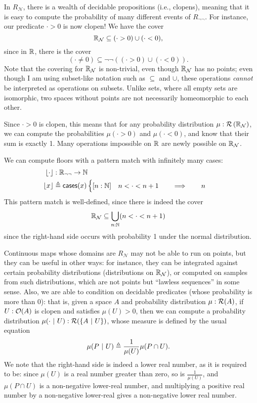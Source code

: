 In $R_\mathcal{N}$, there is a wealth of decidable propositions (i.e., clopens), meaning that it is easy to compute the probability of many different events of $R_{\neg\neg}$. For instance, our predicate $\cdot > 0$ is now clopen! We have the cover
\[
\mathbb{R}_{\mathcal{N}} \subseteq (\cdot > 0) \cup (\cdot < 0),
\]
since in $\mathbb{R}$, there is the cover
\[
(\cdot \neq 0) \subseteq \neg \neg \left( (\cdot > 0) \cup (\cdot < 0) \right).
\]
Note that the covering for $\mathbb{R}_\mathcal{N}$ is non-trivial, even though $\mathbb{R}_\mathcal{N}$ has no points; even though I am using subset-like notation such as $\subseteq$ and $\cup$, these operations \emph{cannot} be interpreted as operations on subsets. Unlike sets, where all empty sets are isomorphic, two spaces without points are not necessarily homeomorphic to each other.

Since $\cdot > 0$ is clopen, this means that for any probability distribution $\mu : \mathcal{R}\left(\mathbb{R}_\mathcal{N}\right)$, we can compute the probabilities $\mu(\cdot > 0)$ and $\mu(\cdot < 0)$, and know that their sum is exactly 1. Many operations impossible on $\mathbb{R}$ are newly possible on $\mathbb{R}_\mathcal{N}$. 

We can compute floors with a pattern match with infinitely many cases:
\begin{align*}
\lfloor \cdot \rfloor &: \mathbb{R}_{\neg\neg} \to \mathbb{N}
\\ \lfloor x \rfloor &\triangleq \mathsf{cases}(x)
\begin{cases}
[n : \mathbb{N}] \quad n < \cdot < n + 1
  \qquad \Longrightarrow \qquad
  n
\end{cases}
\end{align*}
This pattern match is well-defined, since there is indeed the cover
\[
\mathbb{R}_\mathcal{N} \subseteq \bigcup_{n : \mathbb{N}} (n < \cdot < n + 1)
\]
since the right-hand side occurs with probability 1 under the normal distribution.

Continuous maps whose domains are $R_\mathcal{N}$ may not be able to run on points, but they can be useful in other ways: for instance, they can be integrated against certain probability distributions (distributions on $\mathbb{R}_\mathcal{N}$), or computed on samples from such distributions, which are not points but ``lawless sequences'' in some sense. Also, we are able to condition on decidable predicates (whose probability is more than 0): that is, given a space $A$ and probability distribution $\mu : \mathcal{R}(A)$, if $U : \mathcal{O}({A})$ is clopen and satisfies $\mu(U) > 0$, then we can compute a probability distribution $\mu(\cdot \ |\  U) : \mathcal{R}(\{A \ |\  U \})$, whose measure is defined by the usual equation
\[
\mu(P \ |\  U) \triangleq \frac{1}{\mu(U)} \mu(P \cap U).
\]
We note that the right-hand side is indeed a lower real number, as it is required to be: since $\mu(U)$ is a real number greater than zero, so is $\frac{1}{\mu(U)}$, and $\mu(P \cap U)$ is a non-negative lower-real number, and multiplying a positive real number by a non-negative lower-real gives a non-negative lower real number.

